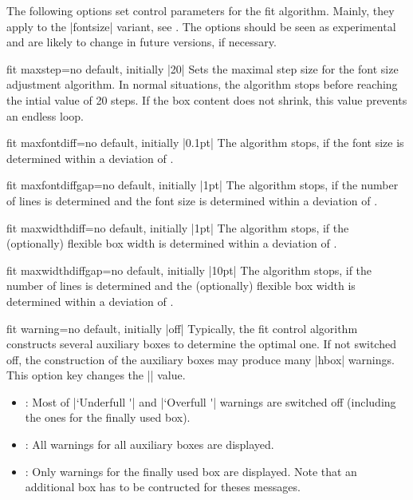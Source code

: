  
\begin{marker}
The following options set control parameters for the fit algorithm.
Mainly, they apply to the |fontsize| variant, see .
The options should be seen as experimental and are likely to change in future versions,
if necessary.
\end{marker}

\begin{docTcbKey}{fit maxstep}{=}{no default, initially |20|}
  Sets the maximal step size for the font size adjustment algorithm.
  In normal situations, the algorithm stops before reaching the intial value of 20 steps.
  If the box content does not shrink, this value prevents an endless loop.
\end{docTcbKey}


\begin{docTcbKey}{fit maxfontdiff}{=}{no default, initially |0.1pt|}
  The algorithm stops, if the font size is determined within a deviation of
  .
\end{docTcbKey}


\begin{docTcbKey}{fit maxfontdiffgap}{=}{no default, initially |1pt|}
  The algorithm stops, if the number of lines is determined and the font size is
  determined within a deviation of .
\end{docTcbKey}


\begin{docTcbKey}{fit maxwidthdiff}{=}{no default, initially |1pt|}
  The algorithm stops, if the (optionally) flexible box width
  is determined within a deviation of .
\end{docTcbKey}


\begin{docTcbKey}{fit maxwidthdiffgap}{=}{no default, initially |10pt|}
  The algorithm stops, if the number of lines is determined and the (optionally) flexible box width
  is determined within a deviation of .
\end{docTcbKey}


\begin{docTcbKey}{fit warning}{=}{no default, initially |off|}
  Typically, the fit control algorithm constructs several auxiliary boxes
  to determine the optimal one. If not switched off, the construction of
  the auxiliary boxes may produce many |hbox| warnings. This option key
  changes the |\hbadness| value.
  \begin{itemize}
  \item{}: Most of |`Underfull \hbox'| and |`Overfull \hbox'| warnings are
    switched off (including the ones for the finally used box).
  \item{}: All warnings for all auxiliary boxes are displayed.
  \item{}: Only warnings for the finally used box are displayed.
    Note that an additional box has to be contructed for theses messages.
  \end{itemize}
\end{docTcbKey}

